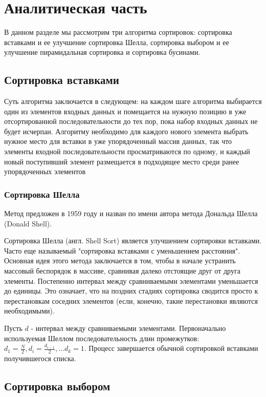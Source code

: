 \chapter{Аналитическая часть}
В данном разделе мы рассмотрим три алгоритма сортировок: сортировка вставками и ее улучшение сортировка Шелла, сортировка выбором и ее улучшение пирамидальная сортировка и сортировка бусинами.
\section{Сортировка вставками}

Суть алгоритма заключается в следующем: на каждом  шаге  алгоритма  выбирается один  из  элементов входных данных и  помещается  на нужную  позицию  в  уже  отсортированной последовательности до тех  пор,  пока  набор  входных  данных  не будет  исчерпан.  Алгоритму  необходимо  для  каждого нового  элемента  выбрать нужное место для вставки в уже упорядоченный массив данных, так что элементы  входной  последовательности просматриваются  по одному,  и каждый новый поступивший элемент размещается  в  подходящее  место среди  ранее  упорядоченных  элементов

\subsection{Сортировка Шелла}

Метод предложен в 1959 году и назван по имени автора метода Дональда Шелла (Donald Shell). 

Сортировка Шелла \cite{book_lipachev, book_sort_algorithms, book_knut} (англ. Shell Sort) является улучшением сортировки вставками. Часто еще называемый "сортировка вставками с уменьшением расстояния". Основная идея этого метода заключается в том, чтобы в начале устранить массовый беспорядок в массиве, сравнивая далеко
отстоящие друг от друга элементы. Постепенно интервал между сравниваемыми элементами уменьшается до единицы. Это означает, что на поздних стадиях сортировка сводится просто к перестановкам соседних элементов (если, конечно, такие перестановки являются необходимыми).

Пусть $d$ - интервал между сравниваемыми элементами. Первоначально используемая Шеллом последовательность длин промежутков: $d_1 = \frac{N}{2}, d_{i} = \frac{d_{i - 1}}{2}, … d_k = 1$. Процесс завершается обычной сортировкой вставками получившегося списка.

\section{Сортировка выбором}


